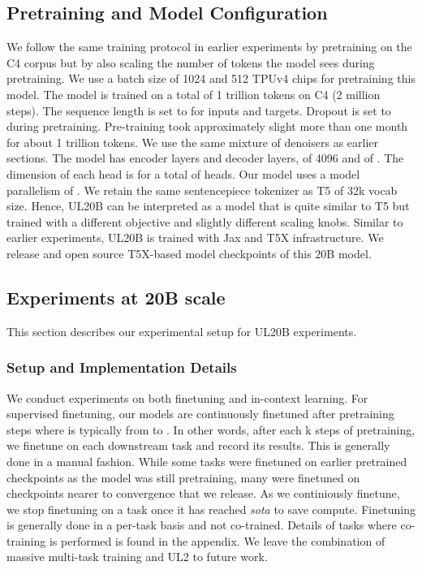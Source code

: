 \documentclass[10pt]{article}
\begin{document}
\subsection{Pretraining and Model Configuration}
We follow the same training protocol in earlier experiments by pretraining on the C4 corpus but by also scaling the number of tokens the model sees during pretraining. We use a batch size of 1024 and 512 TPUv4 chips for pretraining this model. The model is trained on a total of 1 trillion tokens on C4 (2 million steps). The sequence length is set to  for inputs and targets. Dropout is set to  during pretraining. Pre-training took approximately slight more than one month for about 1 trillion tokens. We use the same mixture of denoisers as earlier sections. The model has  encoder layers and  decoder layers,  of 4096 and  of . The dimension of each head is  for a total of  heads. Our model uses a model parallelism of . We retain the same sentencepiece tokenizer as T5 of 32k vocab size. Hence, UL20B can be interpreted as a model that is quite similar to T5 but trained with a different objective and slightly different scaling knobs. Similar to earlier experiments, UL20B is trained with Jax and T5X infrastructure. We release and open source T5X-based model checkpoints of this 20B model.


\subsection{Experiments at 20B scale}
This section describes our experimental setup for UL20B experiments.
\subsubsection{Setup and Implementation Details}
We conduct experiments on both finetuning and in-context learning. For supervised finetuning, our models are continuously finetuned after  pretraining steps where  is typically from  to . In other words, after each k steps of pretraining, we finetune on each downstream task and record its results. This is generally done in a manual fashion. While some tasks were finetuned on earlier pretrained checkpoints as the model was still pretraining, many were finetuned on checkpoints nearer to convergence that we release. As we continiously finetune, we stop finetuning on a task once it has reached \textit{sota} to save compute. Finetuning is generally done in a per-task basis and not co-trained. Details of tasks where co-training is performed is found in the appendix. We leave the combination of massive multi-task training \citep{aribandi2021ext5} and UL2 to future work. 
\end{document}
